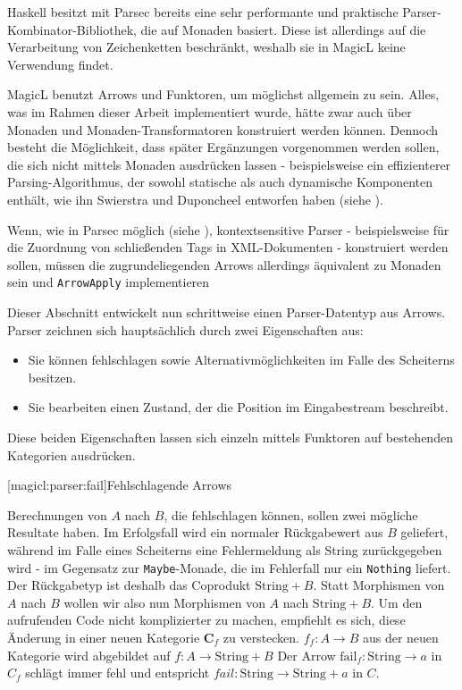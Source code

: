 \documentclass[a4paper, bibgerm]{book}
\newcommand\icode[1]{\lstinline?#1?}
\newcommand\lsubsection{}
\begin{document}
Haskell besitzt mit Parsec\cite{Parsec} bereits eine sehr
performante und praktische Parser-Kombinator-Bibliothek, die auf Monaden
basiert. Diese ist allerdings auf die Verarbeitung von Zeichenketten
beschränkt, weshalb sie in MagicL keine Verwendung findet.

MagicL benutzt Arrows und Funktoren, um möglichst allgemein zu
sein. Alles, was im Rahmen dieser Arbeit implementiert wurde, hätte zwar
auch über Monaden und Monaden-Transformatoren konstruiert werden
können. Dennoch besteht die Möglichkeit, dass später Ergänzungen
vorgenommen werden sollen, die sich nicht mittels Monaden ausdrücken
lassen - beispielsweise ein effizienterer Parsing-Algorithmus, der
sowohl statische als auch dynamische Komponenten enthält, wie ihn
Swierstra und Duponcheel entworfen haben (siehe \cite[S. 8ff]{Hughes}).

Wenn, wie in Parsec möglich (siehe \cite[S. 3]{Parsec}),
kontextsensitive Parser - beispielsweise für die Zuordnung von
schließenden Tags in XML-Dokumenten - konstruiert werden sollen,
müssen die zugrundeliegenden Arrows allerdings äquivalent zu Monaden
sein und \icode{ArrowApply} implementieren

Dieser Abschnitt entwickelt nun schrittweise einen Parser-Datentyp aus
Arrows. Parser zeichnen sich hauptsächlich durch zwei Eigenschaften aus:
\begin{itemize}
\item Sie können fehlschlagen sowie Alternativmöglichkeiten im Falle des
  Scheiterns besitzen.
\item Sie bearbeiten einen Zustand, der die Position im Eingabestream
  beschreibt.
\end{itemize}
Diese beiden Eigenschaften lassen sich einzeln mittels Funktoren auf
bestehenden Kategorien ausdrücken.

\lsubsection[magicl:parser:fail]{Fehlschlagende Arrows}

Berechnungen von $A$ nach $B$, die fehlschlagen können, sollen zwei
mögliche Resultate haben. Im Erfolgsfall wird ein normaler Rückgabewert
aus $B$ geliefert, während im Falle eines Scheiterns eine Fehlermeldung
als String zurückgegeben wird - im Gegensatz zur \icode{Maybe}-Monade,
die im Fehlerfall nur ein \icode{Nothing} liefert. Der Rückgabetyp ist
deshalb das Coprodukt $\mathrm{String}+B$. Statt Morphismen von $A$ nach
$B$ wollen wir also nun Morphismen von $A$ nach $\mathrm{String}+B$. Um
den aufrufenden Code nicht komplizierter zu machen, empfiehlt es sich,
diese Änderung in einer neuen Kategorie $\mathbf{C}_f$ zu
verstecken. $f_{f} : A \rightarrow B$ aus der neuen Kategorie wird
abgebildet auf $f : A \rightarrow \mathrm{String} + B$ Der Arrow
$\mathrm{fail}_{f} : \mathrm{String} \rightarrow a$ in $C_{f}$ schlägt
immer fehl und entspricht $fail : \mathrm{String} \rightarrow
\mathrm{String} + a$ in $C$.
\end{document}
